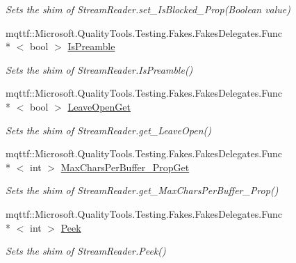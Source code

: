 \begin{DoxyCompactItemize}
\begin{DoxyCompactList}\small\item\em Sets the shim of Stream\-Reader.\-set\-\_\-\-Is\-Blocked\-\_\-\-Prop(\-Boolean value)\end{DoxyCompactList}\item 
mqttf\-::\-Microsoft.\-Quality\-Tools.\-Testing.\-Fakes.\-Fakes\-Delegates.\-Func\\*
$<$ bool $>$ \hyperlink{class_system_1_1_i_o_1_1_fakes_1_1_shim_stream_reader_af5573d5de54382440ac6dd7009be90b1}{Is\-Preamble}
\begin{DoxyCompactList}\small\item\em Sets the shim of Stream\-Reader.\-Is\-Preamble()\end{DoxyCompactList}\item 
mqttf\-::\-Microsoft.\-Quality\-Tools.\-Testing.\-Fakes.\-Fakes\-Delegates.\-Func\\*
$<$ bool $>$ \hyperlink{class_system_1_1_i_o_1_1_fakes_1_1_shim_stream_reader_a733b7e6580337900b3d1af7522249e22}{Leave\-Open\-Get}
\begin{DoxyCompactList}\small\item\em Sets the shim of Stream\-Reader.\-get\-\_\-\-Leave\-Open()\end{DoxyCompactList}\item 
mqttf\-::\-Microsoft.\-Quality\-Tools.\-Testing.\-Fakes.\-Fakes\-Delegates.\-Func\\*
$<$ int $>$ \hyperlink{class_system_1_1_i_o_1_1_fakes_1_1_shim_stream_reader_ab1aeff9cde4c36edfc82b1e42841865d}{Max\-Chars\-Per\-Buffer\-\_\-\-Prop\-Get}
\begin{DoxyCompactList}\small\item\em Sets the shim of Stream\-Reader.\-get\-\_\-\-Max\-Chars\-Per\-Buffer\-\_\-\-Prop()\end{DoxyCompactList}\item 
mqttf\-::\-Microsoft.\-Quality\-Tools.\-Testing.\-Fakes.\-Fakes\-Delegates.\-Func\\*
$<$ int $>$ \hyperlink{class_system_1_1_i_o_1_1_fakes_1_1_shim_stream_reader_ab4b4ff691b237aaebfd037f5a3f255af}{Peek}
\begin{DoxyCompactList}\small\item\em Sets the shim of Stream\-Reader.\-Peek()\end{DoxyCompactList}\item 

\end{DoxyCompactItemize}
